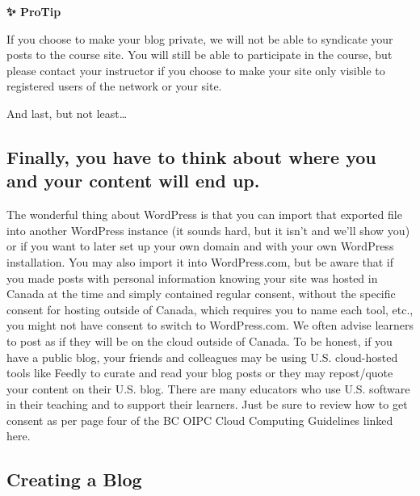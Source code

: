 \documentclass[
]{book}
\begin{document}
\begin{protip}
\textbf{✨ ProTip}

If you choose to make your blog private, we will not be able to
syndicate your posts to the course site. You will still be able to
participate in the course, but please contact your instructor if you
choose to make your site only visible to registered users of the network
or your site.
\end{protip}

And last, but not least\ldots{}

\hypertarget{finally-you-have-to-think-about-where-you-and-your-content-will-end-up.}{%
\subsection*{Finally, you have to think about where you and your content will end up.}\label{finally-you-have-to-think-about-where-you-and-your-content-will-end-up.}}

The wonderful thing about WordPress is that you can import that exported file into another WordPress instance (it sounds hard, but it isn't and we'll show you) or if you want to later set up your own domain and with your own WordPress installation. You may also import it into WordPress.com, but be aware that if you made posts with personal information knowing your site was hosted in Canada at the time and simply contained regular consent, without the specific consent for hosting outside of Canada, which requires you to name each tool, etc., you might not have consent to switch to WordPress.com. We often advise learners to post as if they will be on the cloud outside of Canada. To be honest, if you have a public blog, your friends and colleagues may be using U.S. cloud-hosted tools like Feedly to curate and read your blog posts or they may repost/quote your content on their U.S. blog. There are many educators who use U.S. software in their teaching and to support their learners. Just be sure to review how to get consent as per page four of the BC OIPC Cloud Computing Guidelines linked here.

\hypertarget{creating-a-blog}{%
\subsection*{Creating a Blog}\label{creating-a-blog}}
\end{document}
